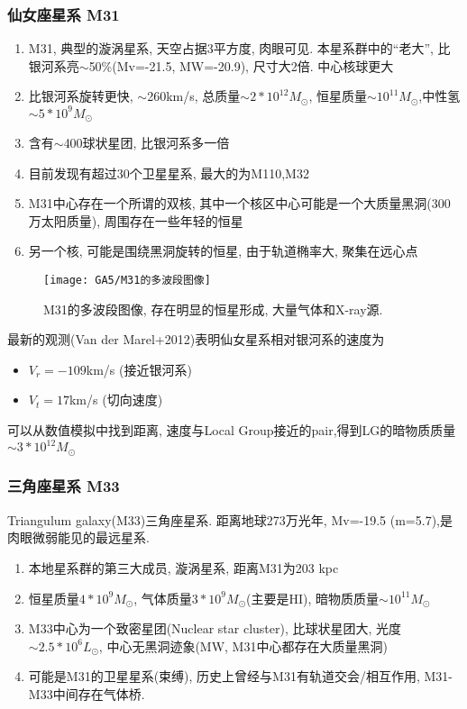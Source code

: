 \subsubsection{仙女座星系 M31}
\begin{enumerate}\small
    \item M31, 典型的漩涡星系, 天空占据3平方度, 肉眼可见. 本星系群中的“老大”, 比银河系亮$\sim$50\%(Mv=-21.5, MW=-20.9), 尺寸大2倍. 中心核球更大
    \item 比银河系旋转更快, $\sim$260km/s, 总质量$\sim 2*10^{12}M_{\odot}$, 恒星质量$\sim 10^{11}M_{\odot}$,中性氢$\sim 5*10^9M_{\odot}$
    \item 含有$\sim$400球状星团, 比银河系多一倍
    \item 目前发现有超过30个卫星星系, 最大的为M110,M32
    \item M31中心存在一个所谓的双核, 其中一个核区中心可能是一个大质量黑洞(300万太阳质量), 周围存在一些年轻的恒星
    \item 另一个核, 可能是围绕黑洞旋转的恒星, 由于轨道椭率大, 聚集在远心点
\end{enumerate}

\begin{figure}[!htb]
    \centering
    \texttt{[image: GA5/M31的多波段图像]}
    \caption{M31的多波段图像, 存在明显的恒星形成, 大量气体和X-ray源. }
\end{figure}

最新的观测(Van der Marel+2012)表明仙女星系相对银河系的速度为
\begin{itemize}
    \item $V_r=-109$km/s (接近银河系)
    \item $V_t = 17$km/s (切向速度)
\end{itemize}
可以从数值模拟中找到距离, 速度与Local Group接近的pair,得到LG的暗物质质量$\sim 3* 10^{12}M_{\odot}$

\subsubsection{三角座星系 M33}
Triangulum galaxy(M33)三角座星系. 距离地球273万光年, Mv=-19.5 (m=5.7),是肉眼微弱能见的最远星系. 

\begin{enumerate}\small
    \item 本地星系群的第三大成员, 漩涡星系, 距离M31为203 kpc
    \item 恒星质量$4*10^9M_{\odot}$, 气体质量$3* 10^9M_{\odot}$(主要是HI), 暗物质质量$\sim 10^{11}M_{\odot}$
    \item M33中心为一个致密星团(Nuclear star cluster), 比球状星团大, 光度$\sim 2.5*10^6L_{\odot}$, 中心无黑洞迹象(MW, M31中心都存在大质量黑洞)
    \item 可能是M31的卫星星系(束缚), 历史上曾经与M31有轨道交会/相互作用, M31-M33中间存在气体桥. 
\end{enumerate}

